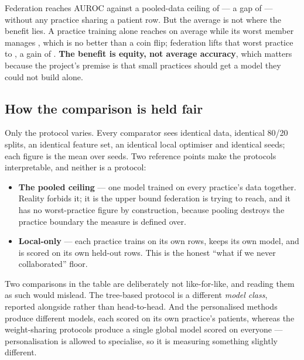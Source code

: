 \label{sec:works}
\statusMeasured

\begin{shortanswer}
Federation reaches \BestFedAUC{} AUROC against a pooled-data ceiling of \CeilingAUC{} --- a gap of
\CeilingGapAbs{} --- without any practice sharing a patient row. But the average is not where the
benefit lies. A practice training alone reaches \LocalAUC{} on average while its worst member
manages \LocalWorst{}, which is no better than a coin flip; federation lifts that worst practice to
\BestFedWorst{}, a gain of \WorstGain{}. \textbf{The benefit is equity, not average accuracy}, which
matters because the project's premise is that small practices should get a model they could not
build alone.
\end{shortanswer}

\subsection{How the comparison is held fair}

Only the protocol varies. Every comparator sees identical data, identical 80/20 splits, an identical
feature set, an identical local optimiser and identical seeds; each figure is the mean over
\NumSeeds{} seeds. Two reference points make the protocols interpretable, and neither is a protocol:

\begin{itemize}
  \item \textbf{The pooled ceiling} --- one model trained on every practice's data together. Reality
        forbids it; it is the upper bound federation is trying to reach, and it has no
        worst-practice figure by construction, because pooling destroys the practice boundary the
        measure is defined over.
  \item \textbf{Local-only} --- each practice trains on its own rows, keeps its own model, and is
        scored on its own held-out rows. This is the honest ``what if we never collaborated'' floor.
\end{itemize}

Two comparisons in the table are deliberately not like-for-like, and reading them as such would
mislead. The tree-based protocol is a different \emph{model class}, reported alongside rather than
head-to-head. And the personalised methods produce \NumPractices{} different models, each scored on
its own practice's patients, whereas the weight-sharing protocols produce a single global model
scored on everyone --- personalisation is allowed to specialise, so it is measuring something
slightly different.

